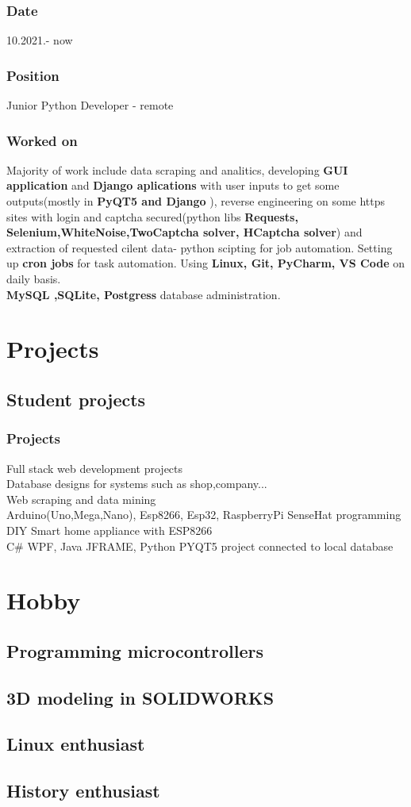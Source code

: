 \documentclass[10pt]{article}
\begin{document}
\subsubsection{Date}
10.2021.- now
\subsubsection{Position}
Junior Python Developer - remote
\subsubsection{Worked on}
Majority of work include data scraping and analitics, developing \textbf{GUI application} and \textbf{Django aplications} with user inputs to get some outputs(mostly in \textbf{ PyQT5 and Django} ), reverse engineering on some 
https sites with login and captcha secured(python libs \textbf{Requests, Selenium,WhiteNoise,TwoCaptcha solver, HCaptcha solver}) and extraction of requested cilent data- python scipting for job automation. Setting up \textbf{cron jobs} for task automation. Using \textbf{Linux, Git, PyCharm, VS Code} on daily basis.  \\
\textbf{MySQL ,SQLite, Postgress} database administration.\\



\section{Projects}
\subsection{\textbf{Student projects}}
\subsubsection{Projects}
Full stack web development projects\\
Database designs for systems such as shop,company...\\
Web scraping and data mining\\
Arduino(Uno,Mega,Nano), Esp8266, Esp32, RaspberryPi SenseHat programming\\
DIY Smart home appliance with ESP8266 \\
C{\#} WPF, Java JFRAME, Python PYQT5 project connected to local database\\
 


\section{Hobby}
\subsection{Programming microcontrollers}
\subsection{3D modeling in SOLIDWORKS}
\subsection{Linux enthusiast}
\subsection{History enthusiast}
\end{document}
